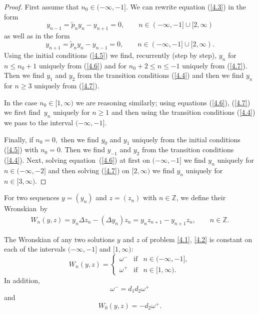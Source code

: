 \documentclass[pdftex]{sigma}
\numberwithin{equation}{section}
\begin{document}
\begin{proof}
First assume that $n_{0}\in (-\infty ,-1].$ We can rewrite equation (\ref{4.3}) in the form%
\begin{equation}
y_{n-1}=\widetilde{p}_{n}y_{n}-y_{n+1}=0,\qquad n\in (-\infty ,-1]\cup
\lbrack 2,\infty )  \label{4.6}
\end{equation}%
as well as in the form%
\begin{equation}
y_{n+1}=\widetilde{p}_{n}y_{n}-y_{n-1}=0,\qquad n\in (-\infty ,-1]\cup
\lbrack 2,\infty ).  \label{4.7}
\end{equation}%
Using the initial conditions (\ref{4.5}) we f\/ind, recurrently (step by
step), $y_{n}$ for $n\leq n_{0}+1$ uniquely from (\ref{4.6}) and for $%
n_{0}+2\leq n\leq -1$ uniquely from (\ref{4.7}). Then we f\/ind $y_{1}$ and $%
y_{2}$ from the transition conditions (\ref{4.4}) and then we f\/ind $y_{n}$
for $n\geq 3$ uniquely from (\ref{4.7}).

In the case $n_{0}\in \lbrack 1,\infty )$ we are reasoning similarly; using
equations (\ref{4.6}), (\ref{4.7}) we f\/irst f\/ind~$y_{n}$ uniquely for $n\geq
1$ and then using the transition conditions (\ref{4.4}) we pass to the
interval $(-\infty ,-1].$

Finally, if $n_{0}=0,$ then we f\/ind $y_{0}$ and $y_{1}$ uniquely from the
initial conditions (\ref{4.5}) with $n_{0}=0$. Then we f\/ind $y_{-1}$ and $%
y_{2}$ from the transition conditions (\ref{4.4}). Next, solving equation~(\ref{4.6}) at f\/irst on $(-\infty ,-1]$ we f\/ind $y_{n}$ uniquely for $n\in
(-\infty ,-2]$ and then solving (\ref{4.7}) on $[2,\infty )$ we f\/ind $y_{n}$
uniquely for $n\in \lbrack 3,\infty ).$
\end{proof}

\begin{definition}
\label{Def4.2}For two sequences $y=(y_{n})$ and $z=(z_{n})$ with $n\in
\mathbb{Z}
$, we def\/ine their Wronskian~by%
\begin{gather*}
W_{n}(y,z) = y_{n}\Delta z_{n}-(\Delta y_{n})z_{n}  = y_{n}z_{n+1}-y_{n+1}z_{n},\qquad n\in
\mathbb{Z}
.
\end{gather*}
\end{definition}

\begin{theorem}
\label{Th4.3} The Wronskian of any two solutions $y$ and $z$ of problem \eqref{4.1}, \eqref{4.2} is constant on each of the intervals $(-\infty ,-1]$ and
$[1,\infty )$:
\begin{equation}
W_{n}(y,z)=\left\{
\begin{array}{lll}
\omega ^{-} & \text{if} & n\in (-\infty ,-1], \\
\omega ^{+} & \text{if} & n\in \lbrack 1,\infty ).%
\end{array}%
\right.  \label{4.8}
\end{equation}%
In addition,
\begin{equation}
\omega ^{-}=d_{1}d_{2}\omega ^{+}  \label{4.9}
\end{equation}%
and%
\begin{equation}
W_{0}(y,z)=-d_{2}\omega ^{+}.  \label{4.10}
\end{equation}
\end{theorem}
\end{document}
